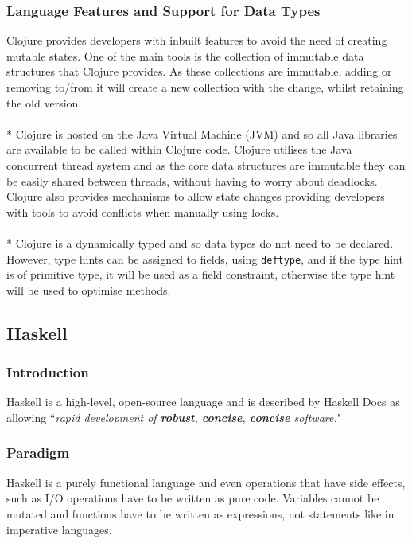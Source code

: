\subsubsection*{Language Features and Support for Data Types}
Clojure provides developers with inbuilt features to avoid the need of creating mutable states. One of the main tools is the collection of immutable data structures that Clojure provides. As these collections are immutable, adding or removing to/from it will create a new collection with the change, whilst retaining the old version.\\\\*
Clojure is hosted on the Java Virtual Machine (JVM) and so all Java libraries are available to be called within Clojure code. Clojure utilises the Java concurrent thread system and as the core data structures are immutable they can be easily shared between threads, without having to worry about deadlocks. Clojure also provides mechanisms to allow state changes providing developers with tools to avoid conflicts when manually using locks. \\\\*
Clojure is a dynamically typed and so data types do not need to be declared. However, type hints can be assigned to fields, using \texttt{deftype}, and if the type hint is of primitive type, it will be used as a field constraint, otherwise the type hint will be used to optimise methods.
\subsection*{Haskell}
\subsubsection*{Introduction}
Haskell is a high-level, open-source language and is described by Haskell Docs as allowing ``\textit{rapid development of \textbf{robust}, \textbf{concise}, \textbf{concise} software.}"
\subsubsection*{Paradigm}
Haskell is a purely functional language and even operations that have side effects, such as I/O operations have to be written as pure code. Variables cannot be mutated and functions have to be written as expressions, not statements like in imperative languages.
